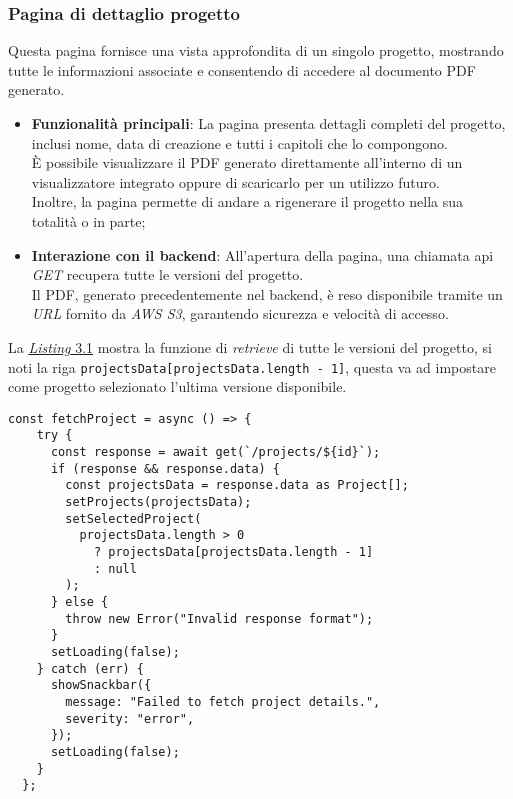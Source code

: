 \subsubsection{Pagina di dettaglio progetto}
Questa pagina fornisce una vista approfondita di un singolo progetto, mostrando tutte le informazioni associate e consentendo di accedere al documento PDF generato.
\begin{itemize}
    \item \textbf{Funzionalità principali}: La pagina presenta dettagli completi del progetto, inclusi nome, data di creazione e tutti i capitoli che lo compongono.\\
    È possibile visualizzare il PDF generato direttamente all'interno di un visualizzatore integrato oppure di scaricarlo per un utilizzo futuro.\\
    Inoltre, la pagina permette di andare a rigenerare il progetto nella sua totalità o in parte;
    \item \textbf{Interazione con il \gls{backend}}: All'apertura della pagina, una chiamata \gls{api} \textit{GET} recupera tutte le versioni del progetto.\\
    Il PDF, generato precedentemente nel \gls{backend}, è reso disponibile tramite un \textit{URL} fornito da \textit{AWS S3}, garantendo sicurezza e velocità di accesso. 
\end{itemize}
\pagebreak
\noindent La {\hyperref[lst:single-project-page]{\textit{Listing} 3.1}} mostra la funzione di \textit{retrieve} di tutte le versioni del progetto, si noti la riga \texttt{projectsData[projectsData.length - 1]}, questa va ad impostare come progetto selezionato l'ultima versione disponibile.

\begin{lstlisting}[caption={Funzione di \textit{retrieve} di tutte le versioni dei progetti}, label={lst:single-project-page}]
  const fetchProject = async () => {
    try {
      const response = await get(`/projects/${id}`);
      if (response && response.data) {
        const projectsData = response.data as Project[];
        setProjects(projectsData);
        setSelectedProject(
          projectsData.length > 0
            ? projectsData[projectsData.length - 1]
            : null
        );
      } else {
        throw new Error("Invalid response format");
      }
      setLoading(false);
    } catch (err) {
      showSnackbar({
        message: "Failed to fetch project details.",
        severity: "error",
      });
      setLoading(false);
    }
  };
  \end{lstlisting}
